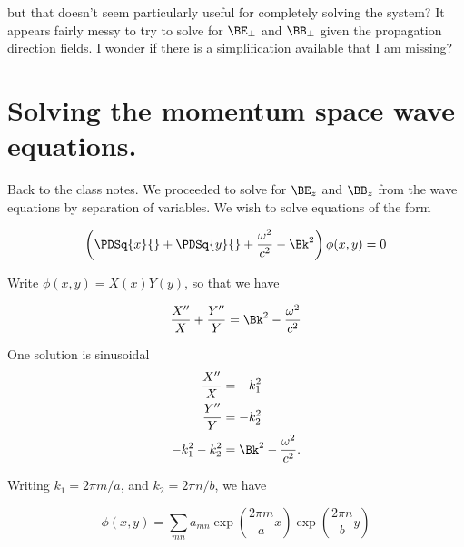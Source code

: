 but that doesn't seem particularly useful for completely solving the system?  It appears fairly messy to try to solve for $\BE_\perp$ and $\BB_\perp$ given the propagation direction fields.  I wonder if there is a simplification available that I am missing?

\section{Solving the momentum space wave equations.}

Back to the class notes.  We proceeded to solve for $\BE_z$ and $\BB_z$ from the wave equations by separation of variables.  We wish to solve equations of the form

\begin{equation}\label{eqn:relativisticElectrodynamicsT4:n}
\left( \PDSq{x}{} + \PDSq{y}{} + \frac{\omega^2}{c^2} - \Bk^2 \right) \phi(x,y) = 0
\end{equation}

Write $\phi(x,y) = X(x) Y(y)$, so that we have

\begin{equation}\label{eqn:relativisticElectrodynamicsT4:n}
\frac{X''}{X} + \frac{Y''}{Y} = \Bk^2 - \frac{\omega^2}{c^2}
\end{equation}

One solution is sinusoidal
\begin{align}\label{eqn:relativisticElectrodynamicsT4:n}
\frac{X''}{X} &= -k_1^2 \\
\frac{Y''}{Y} &= -k_2^2 \\
-k_1^2 - k_2^2
&= \Bk^2 - \frac{\omega^2}{c^2}.
\end{align}

Writing $k_1 = 2\pi m/a$, and $k_2 = 2 \pi n/ b$, we have

\begin{equation}\label{eqn:relativisticElectrodynamicsT4:n}
\phi(x, y) = \sum_{mn} a_{mn} 
\exp\left( \frac{2 \pi m}{a} x \right)
\exp\left( \frac{2 \pi n}{b} y \right)
\end{equation}

\EndNoBibArticle
